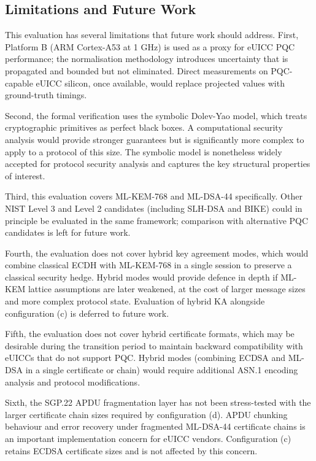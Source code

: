 \documentclass[a4paper,fleqn]{cas-sc}
\begin{document}
\subsection{Limitations and Future Work}
\label{sec:disc-limitations}

This evaluation has several limitations that future work should address.
First, Platform B (ARM Cortex-A53 at 1 GHz) is used as a proxy for eUICC
PQC performance; the normalisation methodology introduces uncertainty
that is propagated and bounded but not eliminated. Direct measurements
on PQC-capable eUICC silicon, once available, would replace projected
values with ground-truth timings.

Second, the formal verification uses the symbolic Dolev-Yao model, which
treats cryptographic primitives as perfect black boxes. A computational
security analysis would provide stronger guarantees but is significantly
more complex to apply to a protocol of this size. The symbolic model
is nonetheless widely accepted for protocol security analysis and
captures the key structural properties of interest.

Third, this evaluation covers ML-KEM-768 and ML-DSA-44 specifically.
Other NIST Level 3 and Level 2 candidates (including SLH-DSA and
BIKE) could in principle be evaluated in the same framework; comparison
with alternative PQC candidates is left for future work.

Fourth, the evaluation does not cover hybrid key agreement modes, which
would combine classical ECDH with ML-KEM-768 in a single session to
preserve a classical security hedge. Hybrid modes would provide defence
in depth if ML-KEM lattice assumptions are later weakened, at the cost
of larger message sizes and more complex protocol state. Evaluation of
hybrid KA alongside configuration (c) is deferred to future work.

Fifth, the evaluation does not cover hybrid certificate formats, which
may be desirable during the transition period to maintain backward
compatibility with eUICCs that do not support PQC. Hybrid modes
(combining ECDSA and ML-DSA in a single certificate or chain) would
require additional ASN.1 encoding analysis and protocol modifications.

Sixth, the SGP.22 APDU fragmentation layer has not been stress-tested
with the larger certificate chain sizes required by configuration (d).
APDU chunking behaviour and error recovery under fragmented ML-DSA-44
certificate chains is an important implementation concern for eUICC
vendors. Configuration (c) retains ECDSA certificate sizes and is not
affected by this concern.
\end{document}

